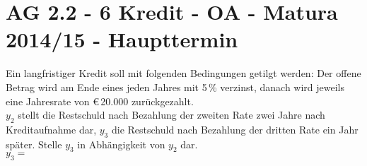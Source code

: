 \section{AG 2.2 - 6 Kredit - OA - Matura 2014/15 - Haupttermin}

\begin{beispiel}[AG 2.2]{1} %
Ein langfristiger Kredit soll mit folgenden Bedingungen getilgt werden: Der offene Betrag wird am Ende eines jeden Jahres mit 5\,\% verzinst, danach wird jeweils eine Jahresrate von \euro\,20.000 zurückgezahlt. \\

$y_2$ stellt die Restschuld nach Bezahlung der zweiten Rate zwei Jahre nach Kreditaufnahme dar, $y_3$ die Restschuld nach Bezahlung der dritten Rate ein Jahr später. Stelle $y_3$ in Abhängigkeit von $y_2$ dar. \\

$y_3 =$ 
\end{beispiel}